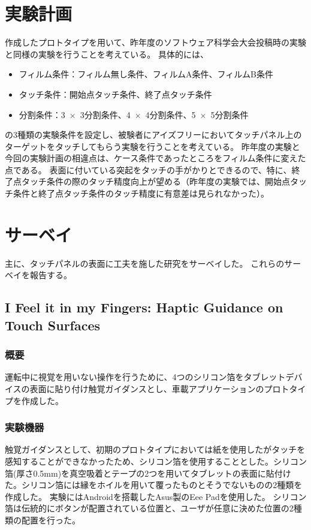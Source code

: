 \documentclass[11pt,a4paper]{jarticle}
\begin{document}
\section{実験計画}
作成したプロトタイプを用いて、昨年度のソフトウェア科学会大会投稿時の実験と同様の実験を行うことを考えている。
具体的には、
\begin{itemize}
	\item フィルム条件：フィルム無し条件、フィルムA条件、フィルムB条件
	\item タッチ条件：開始点タッチ条件、終了点タッチ条件
	\item 分割条件：3~$\times$~3分割条件、4~$\times$~4分割条件、5~$\times$~5分割条件
\end{itemize}
の3種類の実験条件を設定し、被験者にアイズフリーにおいてタッチパネル上のターゲットをタッチしてもらう実験を行うことを考えている。
昨年度の実験と今回の実験計画の相違点は、ケース条件であったところをフィルム条件に変えた点である。
表面に付いている突起をタッチの手がかりとできるので、特に、終了点タッチ条件の際のタッチ精度向上が望める（昨年度の実験では、開始点タッチ条件と終了点タッチ条件のタッチ精度に有意差は見られなかった）。

\section{サーベイ}
主に、タッチパネルの表面に工夫を施した研究をサーベイした。
これらのサーベイを報告する。

\subsection{I Feel it in my Fingers: Haptic Guidance on Touch Surfaces\cite{Zimmermann:2014}}
\subsubsection{概要}
運転中に視覚を用いない操作を行うために、4つのシリコン箔をタブレットデバイスの表面に貼り付け触覚ガイダンスとし、車載アプリケーションのプロトタイプを作成した。


\subsubsection{実験機器}
触覚ガイダンスとして、初期のプロトタイプにおいては紙を使用したがタッチを感知することができなかったため、シリコン箔を使用することとした。シリコン箔(厚さ0.5mm)を真空吸着とテープの2つを用いてタブレットの表面に貼付けた。シリコン箔には縁をホイルを用いて覆ったものとそうでないものの2種類を作成した。
実験にはAndroidを搭載したAsus製のEee Padを使用した。
シリコン箔は伝統的にボタンが配置されている位置と、ユーザが任意に決めた位置の2種類の配置を行った。
\end{document}
